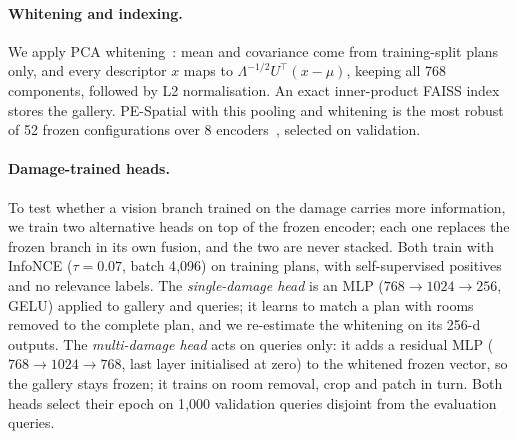 \paragraph{Whitening and indexing.}
We apply PCA whitening~\cite{jegou2012whitening}: mean and covariance come from training-split plans only, and every descriptor $x$ maps to $\Lambda^{-1/2}U^\top(x-\mu)$, keeping all 768 components, followed by L2 normalisation.
An exact inner-product FAISS index~\cite{douze2025faiss} stores the gallery.
PE-Spatial with this pooling and whitening is the most robust of 52 frozen configurations over 8 encoders~\cite{oquab2024dinov2,simeoni2025dinov3,tschannen2025siglip2,ranzinger2024amradio,assran2023ijepa,cao2026tipsv2,bolya2025perception}, selected on validation.

\paragraph{Damage-trained heads.}
To test whether a vision branch trained on the damage carries more information, we train two alternative heads on top of the frozen encoder; each one replaces the frozen branch in its own fusion, and the two are never stacked.
Both train with InfoNCE ($\tau=0.07$, batch 4{,}096) on training plans, with self-supervised positives and no relevance labels.
The \emph{single-damage head} is an MLP ($768\to1024\to256$, GELU) applied to gallery and queries; it learns to match a plan with rooms removed to the complete plan, and we re-estimate the whitening on its 256-d outputs.
The \emph{multi-damage head} acts on queries only: it adds a residual MLP ($768\to1024\to768$, last layer initialised at zero) to the whitened frozen vector, so the gallery stays frozen; it trains on room removal, crop and patch in turn.
Both heads select their epoch on 1{,}000 validation queries disjoint from the evaluation queries.
